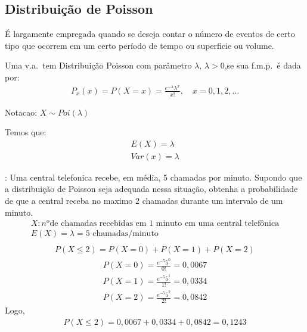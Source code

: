 \subsection{Distribuição de Poisson}
\begin{description}
  \item É largamente empregada quando se deseja contar o número de eventos de certo tipo
que ocorrem em um certo período de tempo ou superficie ou volume.
\item[Definicao] Uma v.a.\ tem Distribuição Poisson com parâmetro $\lambda$, $\lambda >0$,se sua
  f.m.p.\ é dada por:
 \begin{align}
   P_{x} (x)= P(X=x)= \frac{e^{-\lambda}\lambda^{x}}{x!}, \quad x=0,1,2,\ldots
 \end{align} 
 \item{Notacao}: $X \mathtt{\sim} Poi(\lambda)$
 \item{Temos que}:
   \begin{align}
     E(X)= \lambda \\
     Var(x)= \lambda
   \end{align}
   \item[Exemplo]: Uma central telefonica recebe, em média, 5 chamadas por minuto.
     Supondo que a distribuição de Poisson seja adequada nessa situação, obtenha a 
     probabilidade de que a central receba no maximo 2 chamadas durante um intervalo
     de um minuto.
     \begin{align*}
       X: n^{o} \text{de chamadas recebidas em 1 minuto em uma central telefônica}\\
       E(X)=\lambda= \text{5 chamadas/minuto}\\
     \end{align*}
     \begin{align*}
       P(X \leq 2)= P(X=0)+ P(X=1)+P(X=2)
     \end{align*}
     \begin{align*}
       P(X=0) = \frac{e^{-5}5^0}{0!}= 0,0067\\
       P(X=1) = \frac{e^{-5}5^1}{1!}= 0,0334\\
       P(X=2) = \frac{e^{-5}5^2}{2!}= 0,0842
     \end{align*}
     Logo,
     \begin{align*}
       P(X \leq 2)= 0,0067+0,0334+0,0842=0,1243
     \end{align*}
   \end{description}
